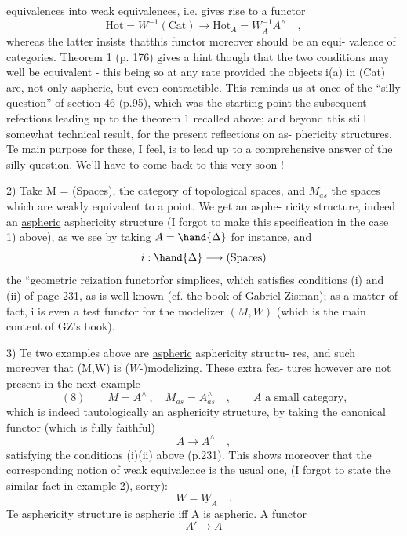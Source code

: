 equivalences into weak equivalences,  i.e.  gives rise to a functor
\[ \mathrm{Hot} = \underline{W}^{-1}(\mathrm{Cat}) \longrightarrow \mathrm{Hot}_A = \underline{W}_A^{-1}A^{\wedge} \quad , \]
whereas the latter insists thatthis functor moreover should be an equi-%
valence of categories.   Theorem 1 (p. 176)  gives a hint though that 
the two conditions may well be equivalent  -  this being so at any rate
provided the objects i(a) in (Cat) are,  not only aspheric,  but even
\uline{contractible}.  This reminds us at once  of the ``silly question'' of
section 46  (p.95),  which was the starting point   the subsequent
refections leading up to the theorem 1 recalled above;  and\hand{,}  beyond
this still somewhat technical result,  for the present  reflections on as-%
phericity structures.  Te main purpose for these,  I feel,  is to lead
up to a comprehensive answer of the silly question.  We'll have to come
back to this very soon !

2)   Take  M = (Spaces),  the category of topological spaces,  and
$M_{as}$ the spaces which are weakly equivalent to a point.  We get an asphe-%
ricity structure,  indeed an \uline{aspheric} asphericity structure (I forgot to
make this  specification  in the case  1) above),  as we see by
taking  $A = \hand{\Delta}$ for instance,  and
\[ i: \hand{\Delta} \longrightarrow (\mathrm{Spaces}) \]
the ``geometric reization functorfor simplices,  which satisfies
conditions (i) and (ii) of page 231,  as is well known (cf. the book of
Gabriel-Zisman);  as a matter of fact,  i is even a test functor for
the modelizer $(M,W)$ (which is  the main content of GZ's book).

3)   Te two examples  above  are \uline{aspheric} asphericity structu-%
res,  and such moreover that (M,W) is ($\underline{W}$-)modelizing.  These extra fea-%
tures however are not  present in the next example
\[ (8) \qquad M = A^{\wedge} \ , \quad M_{as} = A^{\wedge}_{as} \quad , \qquad A \text{ a small category,} \]
which is indeed tautologically an asphericity structure,  by taking
the canonical  functor  (which is fully faithful)
\[ A \longrightarrow A^{\wedge} \quad , \]
satisfying the conditions (i)(ii) above (p.231).   This shows moreover
that the corresponding notion of weak equivalence is the usual one,
(I forgot to state the similar fact in example 2), sorry):
\[ W = \underline{W}_A \quad . \]
Te asphericity structure is aspheric iff A is aspheric.  A functor
\[ A' \longrightarrow A \]
